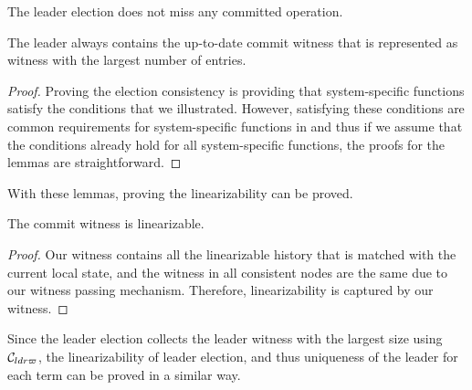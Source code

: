 \begin{lemma}\label{lemma:chapter:witnesspassing:election-consistency}
The leader election does not miss any committed operation.
\end{lemma}

\begin{lemma} 
The leader always contains the up-to-date commit witness that is represented as
witness with the largest number of entries.
\end{lemma}

\begin{proof}
Proving the election consistency is providing that system-specific functions 
satisfy the conditions that we illustrated. However, satisfying these
conditions are common requirements for system-specific functions in
\sysname{} and thus if we assume that the conditions already hold for all
system-specific functions, the proofs for the lemmas are straightforward.
\end{proof}

With these lemmas, proving the linearizability can be proved.

\begin{theorem}[linearizability]\label{theorem:chapter:witnesspassing:linear-spec}
The commit witness is linearizable.
\end{theorem}

\begin{proof}
Our witness contains all the linearizable history that is matched with the current local state, 
and the witness in all consistent nodes are the same due to our witness passing mechanism. 
Therefore, linearizability is captured by our witness.
\end{proof}

Since the leader election collects the leader witness with the largest
size using $\mathcal{C}_{ldr\varpi}$, the linearizability of leader election, and thus uniqueness of the leader
for each term can be proved in a similar way. 
